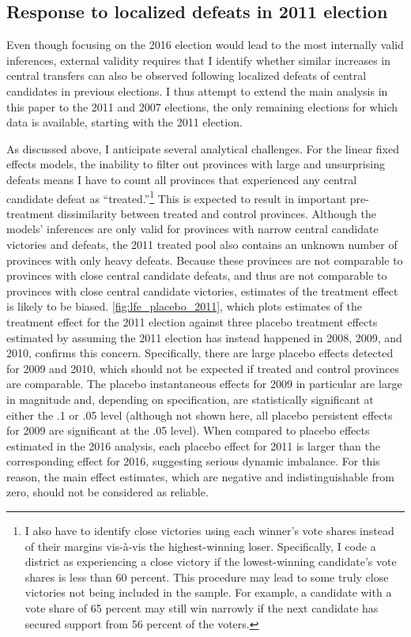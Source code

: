 \documentclass[12pt]{article}
\newcommand\fnote[1]{\footnote{\baselineskip=2\normalbaselineskip#1}}
\newcommand{\1}{\mathbbm{1}}
\begin{document}
\subsection{Response to localized defeats in 2011 election}

Even though focusing on the 2016 election would lead to the most internally valid inferences, external validity requires that I identify whether similar increases in central transfers can also be observed following localized defeats of central candidates in previous elections. I thus attempt to extend the main analysis in this paper to the 2011 and 2007 elections, the only remaining elections for which data is available, starting with the 2011 election.

As discussed above, I anticipate several analytical challenges. For the linear fixed effects models, the inability to filter out provinces with large and unsurprising defeats means I have to count all provinces that experienced any central candidate defeat as ``treated.''\fnote{I also have to identify close victories using each winner's vote shares instead of their margins vis-\`{a}-vis the highest-winning loser. Specifically, I code a district as experiencing a close victory if the lowest-winning candidate's vote shares is less than 60 percent. This procedure may lead to some truly close victories not being included in the sample. For example, a candidate with a vote share of 65 percent may still win narrowly if the next candidate has secured support from 56 percent of the voters.} This is expected to result in important pre-treatment dissimilarity between treated and control provinces. Although the models' inferences are only valid for provinces with narrow central candidate victories and defeats, the 2011 treated pool also contains an unknown number of provinces with only heavy defeats. Because these provinces are not comparable to provinces with close central candidate defeats, and thus are not comparable to provinces with close central candidate victories, estimates of the treatment effect is likely to be biased. \autoref{fig:lfe_placebo_2011}, which plots estimates of the treatment effect for the 2011 election against three placebo treatment effects estimated by assuming the 2011 election has instead happened in 2008, 2009, and 2010, confirms this concern. Specifically, there are large placebo effects detected for 2009 and 2010, which should not be expected if treated and control provinces are comparable. The placebo instantaneous effects for 2009 in particular are large in magnitude and, depending on specification, are statistically significant at either the .1 or .05 level (although not shown here, all placebo persistent effects for 2009 are significant at the .05 level). When compared to placebo effects estimated in the 2016 analysis, each placebo effect for 2011 is larger than the corresponding effect for 2016, suggesting serious dynamic imbalance. For this reason, the main effect estimates, which are negative and indistinguishable from zero, should not be considered as reliable.
\end{document}
